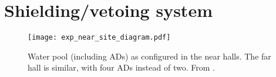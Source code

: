 \documentclass[../thesis.tex]{subfiles}
\begin{document}
\section{Shielding/vetoing system}
\label{sec:expShieldVeto}

\begin{figure}[ht]
  \texttt{[image: exp\_near\_site\_diagram.pdf]}
  \caption{Water pool (including ADs) as configured in the near halls. The far hall is similar, with four ADs instead of two. From \cite{An_2017}.}
  \label{fig:expPool}
\end{figure}

\subfilebackmatter
\end{document}
